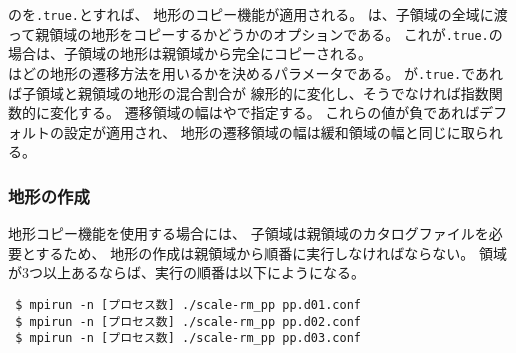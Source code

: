 \noindent
{}のを\verb|.true.|とすれば、
地形のコピー機能が適用される。
は、子領域の全域に渡って親領域の地形をコピーするかどうかのオプションである。
これが\verb|.true.|の場合は、子領域の地形は親領域から完全にコピーされる。\\
はどの地形の遷移方法を用いるかを決めるパラメータである。
が\verb|.true.|であれば子領域と親領域の地形の混合割合が
線形的に変化し、そうでなければ指数関数的に変化する。
遷移領域の幅はやで指定する。
これらの値が負であればデフォルトの設定が適用され、
地形の遷移領域の幅は緩和領域の幅と同じに取られる。


\subsubsection{地形の作成}

地形コピー機能を使用する場合には、
子領域は親領域のカタログファイルを必要とするため、
地形の作成は親領域から順番に実行しなければならない。
領域が3つ以上あるならば、実行の順番は以下にようになる。

\begin{verbatim}
 $ mpirun -n [プロセス数] ./scale-rm_pp pp.d01.conf
 $ mpirun -n [プロセス数] ./scale-rm_pp pp.d02.conf
 $ mpirun -n [プロセス数] ./scale-rm_pp pp.d03.conf
\end{verbatim}
